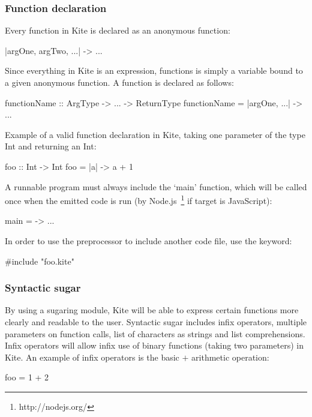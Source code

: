\subsubsection{Function declaration}
Every function in Kite is declared as an anonymous function:

\begin{kite}
|argOne, argTwo, ...| -> { ... }
\end{kite}

Since everything in Kite is an expression, functions is simply a variable bound to a given anonymous function. A function is declared as follows:

\begin{kite}
functionName :: ArgType -> ... -> ReturnType
functionName = |argOne, ...| -> { ... }
\end{kite}

Example of a valid function declaration in Kite, taking one parameter of the type Int and returning an Int:

\begin{kite}
foo :: Int -> Int
foo = |a| -> {
  a + 1
}
\end{kite}

A runnable program must always include the `main' function, which will be called once when the emitted code is run (by Node.js~\footnote{http://nodejs.org/} if target is JavaScript):

\begin{kite}
main = -> { ... }
\end{kite}

In order to use the preprocessor to include another code file, use the  keyword:

\begin{kite}
#include "foo.kite"
\end{kite}


\subsubsection{Syntactic sugar}
\label{sec:kite-design-sugar}
By using a sugaring module, Kite will be able to express certain functions more clearly and readable to the user. Syntactic sugar includes infix operators, multiple parameters on function calls, list of characters as strings and list comprehensions. Infix operators will allow infix use of binary functions (taking two parameters) in Kite. An example of infix operators is the basic $+$ arithmetic operation:

\begin{kite}
foo = 1 + 2
\end{kite}

